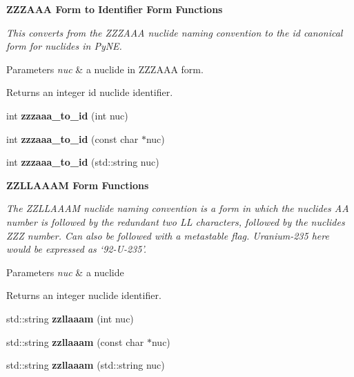 \begin{Indent}\textbf{ Z\+Z\+Z\+A\+AA Form to Identifier Form Functions}\par
{\em This converts from the Z\+Z\+Z\+A\+AA nuclide naming convention to the id canonical form for nuclides in Py\+NE. 
\begin{DoxyParams}{Parameters}
{\em nuc} & a nuclide in Z\+Z\+Z\+A\+AA form. \\
\hline
\end{DoxyParams}
\begin{DoxyReturn}{Returns}
an integer id nuclide identifier. 
\end{DoxyReturn}
}\begin{DoxyCompactItemize}
\item 
\mbox{\label{namespacepyne_1_1nucname_a655aba032448b6a33135b0e7a49e98ad}} 
int {\bfseries zzzaaa\+\_\+to\+\_\+id} (int nuc)
\item 
\mbox{\label{namespacepyne_1_1nucname_a50ceb685138aab76cfa4c65b515fa6a1}} 
int {\bfseries zzzaaa\+\_\+to\+\_\+id} (const char $\ast$nuc)
\item 
\mbox{\label{namespacepyne_1_1nucname_a1d83a3f4a7cdc8b712077bfb9a5a1963}} 
int {\bfseries zzzaaa\+\_\+to\+\_\+id} (std\+::string nuc)
\end{DoxyCompactItemize}
\end{Indent}
\begin{Indent}\textbf{ Z\+Z\+L\+L\+A\+A\+AM Form Functions}\par
{\em The Z\+Z\+L\+L\+A\+A\+AM nuclide naming convention is a form in which the nuclides AA number is followed by the redundant two LL characters, followed by the nuclides Z\+ZZ number. Can also be followed with a metastable flag. Uranium-\/235 here would be expressed as ‘92-\/\+U-\/235’. 
\begin{DoxyParams}{Parameters}
{\em nuc} & a nuclide \\
\hline
\end{DoxyParams}
\begin{DoxyReturn}{Returns}
an integer nuclide identifier. 
\end{DoxyReturn}
}\begin{DoxyCompactItemize}
\item 
\mbox{\label{namespacepyne_1_1nucname_ab11175f9aa7d8f9437b3b43531c94a89}} 
std\+::string {\bfseries zzllaaam} (int nuc)
\item 
\mbox{\label{namespacepyne_1_1nucname_abc69b988fbd66fdb21d43c480db4333a}} 
std\+::string {\bfseries zzllaaam} (const char $\ast$nuc)
\item 
\mbox{\label{namespacepyne_1_1nucname_a3e184c78ba73f04348963e2158c32a8d}} 
std\+::string {\bfseries zzllaaam} (std\+::string nuc)
\end{DoxyCompactItemize}
\end{Indent}
